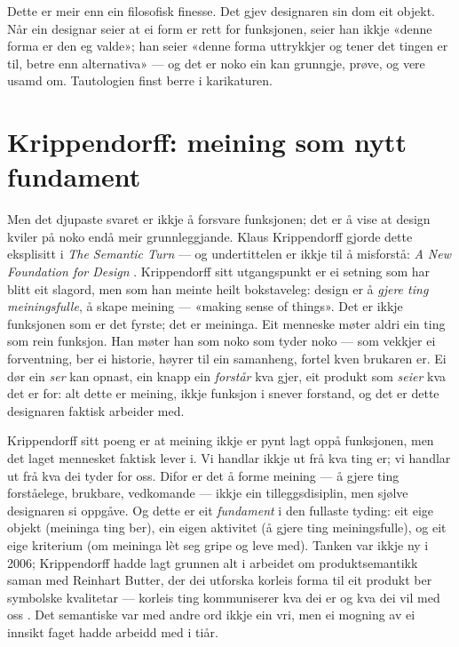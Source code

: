 Dette er meir enn ein filosofisk finesse. Det gjev designaren sin dom eit objekt. Når ein designar seier at ei form er rett for funksjonen, seier han ikkje «denne forma er den eg valde»; han seier «denne forma uttrykkjer og tener det tingen er til, betre enn alternativa» — og det er noko ein kan grunngje, prøve, og vere usamd om. Tautologien finst berre i karikaturen.

\section{Krippendorff: meining som nytt fundament}

Men det djupaste svaret er ikkje å forsvare funksjonen; det er å vise at design kviler på noko endå meir grunnleggjande. Klaus Krippendorff gjorde dette eksplisitt i \emph{The Semantic Turn} — og undertittelen er ikkje til å misforstå: \emph{A New Foundation for Design} \autocite{krippendorff2006}. Krippendorff sitt utgangspunkt er ei setning som har blitt eit slagord, men som han meinte heilt bokstaveleg: design er å \emph{gjere ting meiningsfulle}, å skape meining — «making sense of things». Det er ikkje funksjonen som er det fyrste; det er meininga. Eit menneske møter aldri ein ting som rein funksjon. Han møter han som noko som tyder noko — som vekkjer ei forventning, ber ei historie, høyrer til ein samanheng, fortel kven brukaren er. Ei dør ein \emph{ser} kan opnast, ein knapp ein \emph{forstår} kva gjer, eit produkt som \emph{seier} kva det er for: alt dette er meining, ikkje funksjon i snever forstand, og det er dette designaren faktisk arbeider med.

Krippendorff sitt poeng er at meining ikkje er pynt lagt oppå funksjonen, men det laget mennesket faktisk lever i. Vi handlar ikkje ut frå kva ting er; vi handlar ut frå kva dei tyder for oss. Difor er det å forme meining — å gjere ting forståelege, brukbare, vedkomande — ikkje ein tilleggsdisiplin, men sjølve designaren si oppgåve. Og dette er eit \emph{fundament} i den fullaste tyding: eit eige objekt (meininga ting ber), ein eigen aktivitet (å gjere ting meiningsfulle), og eit eige kriterium (om meininga lèt seg gripe og leve med). Tanken var ikkje ny i 2006; Krippendorff hadde lagt grunnen alt i arbeidet om produktsemantikk saman med Reinhart Butter, der dei utforska korleis forma til eit produkt ber symbolske kvalitetar — korleis ting kommuniserer kva dei er og kva dei vil med oss \autocite{krippendorff1984semantics}. Det semantiske var med andre ord ikkje ein vri, men ei mogning av ei innsikt faget hadde arbeidd med i tiår.

